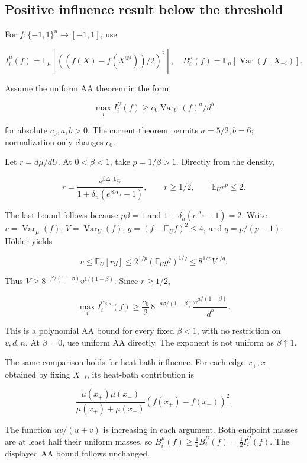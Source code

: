 \subsection{Positive influence result below the threshold}\label{qm:positive-influence-result-below-the-threshold}

For \(f:\{-1,1\}^n\to[-1,1]\), use

\[
I_i^\mu(f)=\mathbb E_\mu[((f(X)-f(X^{\oplus i}))/2)^2],
\quad B_i^\mu(f)=\mathbb E_\mu[\operatorname{Var}(f\mid X_{-i})].
\]

Assume the uniform AA theorem in the form

\[
\max_i I_i^U(f)\ge c_0\operatorname{Var}_U(f)^a/d^b
\]

for absolute \(c_0,a,b>0\). The current theorem permits \(a=5/2,b=6\); normalization only changes \(c_0\).

Let \(r=d\mu/dU\). At \(0<\beta<1\), take \(p=1/\beta>1\). Directly from the density,

\[
r=\frac{e^{\beta\Delta_n\mathbf1_{C_n}}}{1+\delta_n(e^{\beta\Delta_n}-1)},
\qquad r\ge1/2,\qquad \mathbb E_Ur^p\le2.
\]

The last bound follows because \(p\beta=1\) and \(1+\delta_n(e^{\Delta_n}-1)=2\). Write \(v=\operatorname{Var}_\mu(f)\), \(V=\operatorname{Var}_U(f)\), \(g=(f-\mathbb E_Uf)^2\le4\), and \(q=p/(p-1)\). Hölder yields

\[
v\le\mathbb E_U[rg]\le2^{1/p}(\mathbb E_Ug^q)^{1/q}
\le8^{1/p}V^{1/q}.
\]

Thus \(V\ge8^{-\beta/(1-\beta)}v^{1/(1-\beta)}\). Since \(r\ge1/2\),

\[
\boxed{\displaystyle
\max_i I_i^{\mu_{\beta,n}}(f)
\ge\frac{c_0}{2}\,8^{-a\beta/(1-\beta)}
\frac{v^{a/(1-\beta)}}{d^b}.}
\]

This is a polynomial AA bound for every fixed \(\beta<1\), with no restriction on \(v,d,n\). At \(\beta=0\), use uniform AA directly. The exponent is not uniform as \(\beta\uparrow1\).

The same comparison holds for heat-bath influence. For each edge \(x_+,x_-\) obtained by fixing \(X_{-i}\), its heat-bath contribution is

\[
\frac{\mu(x_+)\mu(x_-)}{\mu(x_+)+\mu(x_-)}(f(x_+)-f(x_-))^2.
\]

The function \(uv/(u+v)\) is increasing in each argument. Both endpoint masses are at least half their uniform masses, so \(B_i^\mu(f)\ge\frac12 B_i^U(f)=\frac12 I_i^U(f)\). The displayed AA bound follows unchanged.
